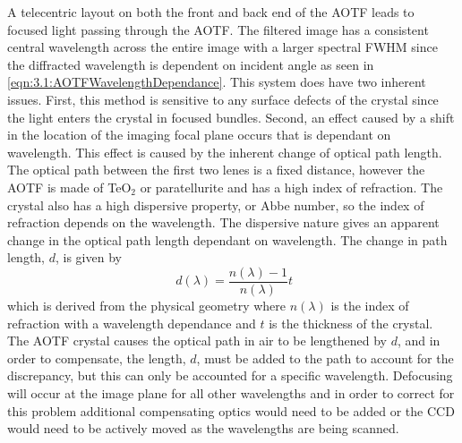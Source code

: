 \documentclass[12pt]{article}
\begin{document}
A telecentric layout on both the front and back end of the AOTF leads to focused light passing through the AOTF. The filtered image has a consistent central wavelength across 
the entire image with a larger spectral FWHM since the diffracted wavelength is dependent on incident angle as seen in \autoref{eqn:3.1:AOTFWavelengthDependance}. This system 
does have two inherent issues. First, this method is sensitive to any surface defects of the crystal since the light enters the crystal in focused bundles. Second, an effect 
caused by a shift in the location of the imaging focal plane occurs that is dependant on wavelength. This effect is caused by the inherent change of optical path length. The 
optical path between the first two lenes is a fixed distance, however the AOTF is made of TeO$_{2}$ or paratellurite and has a high index of refraction. The crystal also has a 
high dispersive property, or Abbe number, so the index of refraction depends on the wavelength. The dispersive nature gives an apparent change in the optical path length 
dependant on wavelength. The change in path length, $d$, is given by
\begin{equation}
    \ d(\lambda) = \frac{n(\lambda)-1}{n(\lambda)}t
    \label{eqn:3.2:opticalPathDisplacement}
\end{equation}
which is derived from the physical geometry where $n(\lambda)$ is the index of refraction with a wavelength dependance and $t$ is the thickness of the crystal. The AOTF crystal 
causes the optical path in air to be lengthened by $d$, and in order to compensate, the length, $d$, must be added to the path to account for the discrepancy, but this can only 
be accounted for a specific wavelength. Defocusing will occur at the image plane for all other wavelengths and in order to correct for this problem additional compensating 
optics would need to be added or the CCD would need to be actively moved as the wavelengths are being scanned.
\end{document}
